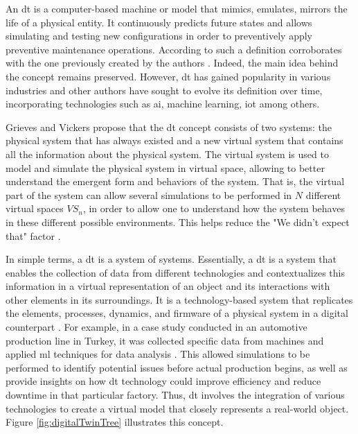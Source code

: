 An \acrfull{dt} is a computer-based machine or model that mimics, emulates, mirrors the life of a physical entity. It continuously predicts future states and allows simulating and testing new configurations in order to preventively apply \cite{Barricelli2019} preventive maintenance operations. According to \cite{Mihai2022} such a definition corroborates with the one previously created by the authors \cite{Grieves2017}.  Indeed, the main idea behind the concept remains preserved. However, \acrshort{dt} has gained popularity in various industries and other authors have sought to evolve its definition over time, incorporating technologies such as \acrshort{ai}, machine learning, \acrshort{iot} among others. 


Grieves and Vickers  propose that the \acrfull{dt} concept consists of two systems: the physical system that has always existed and a new virtual system that contains all the information about the physical system. The virtual system is used to model and simulate the physical system in virtual space, allowing to better understand the emergent form and behaviors of the system. That is, the virtual part of the system can allow several simulations to be performed in $N$ different virtual spaces $VS_n$, in order to allow one to understand how the system behaves in these different possible environments. This helps reduce the "We didn't expect that" factor \cite{Grieves2017}.

In simple terms, a \acrfull{dt} is a system of systems. Essentially, a \acrshort{dt} is a system that enables the collection of data from different technologies and contextualizes this information in a virtual representation of an object and its interactions with other elements in its surroundings. It is a technology-based system that replicates the elements, processes, dynamics, and firmware of a physical system in a digital counterpart \cite{Mihai2022}. For example, in a case study conducted in an automotive production line in Turkey, it was collected specific data from machines and applied \acrfull{ml} techniques for data analysis \cite{Mendi2022}. This allowed simulations to be performed to identify potential issues before actual production begins, as well as provide insights on how \acrshort{dt} technology could improve efficiency and reduce downtime in that particular factory. Thus, \acrshort{dt} involves the integration of various technologies to create a virtual model that closely represents a real-world object. Figure \ref{fig:digitalTwinTree} illustrates this concept.

